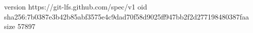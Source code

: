 version https://git-lfs.github.com/spec/v1
oid sha256:7b0387e3b42b85abf3575e4c9dad70f58d9025ff947bb2f2d277198480387faa
size 57897
